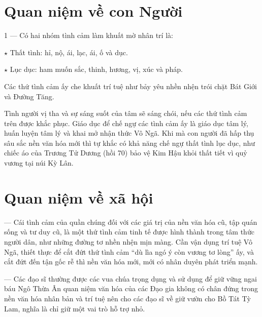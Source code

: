 \section{Quan niệm về con Người} %
\label{sec:72_73_con_nguoi}

1 — Có hai nhóm tình cảm làm khuất mờ nhân trí là:

$\star$ Thất tình: hỉ, nộ, ái, lạc, ái, ố và dục.

$\star$ Lục dục: ham muốn sắc, thinh, hương, vị, xúc và pháp.

Các thứ tình cảm ấy che khuất trí tuệ như bảy yêu nhền nhện trói chặt Bát Giới và Đường Tăng.

Tình người vị tha và sự sáng suốt của tâm sẽ sáng chói, nếu các thứ tình cảm trên được khắc phục. Giáo dục để chế ngự các tình cảm ấy là giáo dục tâm lý, huấn luyện tâm lý và khai mở nhận thức Vô Ngã. Khi mà con người đã hấp thụ sâu sắc nền văn hóa mới thì tự khắc có khả năng chế ngự thất tình lục dục, như chiếc áo của Trương Tử Dương (hồi 70) bảo vệ Kim Hậu khỏi thất tiết vì quỷ vương tại núi Kỳ Lân.

\section{Quan niệm về xã hội} %
\label{sec:72_73_xa_hoi}

— Cái tình cảm của quần chúng đối với các giá trị của nền văn hóa cũ, tập quán sống và tư duy cũ, là một thứ tình cảm tinh tế được hình thành trong tâm thức người dân, như những đường tơ nhền nhện mịn màng. Cần vận dụng trí tuệ Vô Ngã, thiết thực để cắt đứt thứ tình cảm ``dù lìa ngó ý còn vương tơ lòng'' ấy, và cắt đứt đến tận gốc rễ thì nền văn hóa mới, mới có nhân duyên phát triển mạnh.

— Các đạo sĩ thường được các vua chúa trọng dụng và sử dụng để giữ vững ngai báu Ngô Thừa Ân quan niệm văn hóa của các Đạo gia không có chân đứng trong nền văn hóa nhân bản và trí tuệ nên cho các đạo sĩ về giữ vườn cho Bồ Tát Tỳ Lam, nghĩa là chỉ giữ một vai trò hỗ trợ nhỏ.
